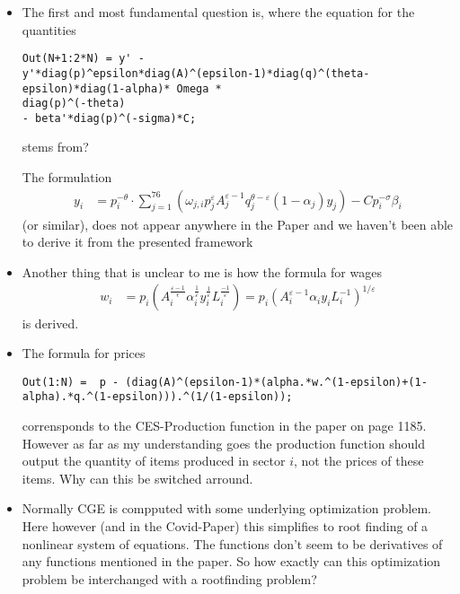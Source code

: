 \documentclass[a4paper,10pt]{article}
\title{}
\author{}
\begin{document}
\maketitle

\begin{itemize}
 \item The first and most fundamental question is, where the equation for the
quantities
 \begin{lstlisting}
Out(N+1:2*N) = y' -
y'*diag(p)^epsilon*diag(A)^(epsilon-1)*diag(q)^(theta-
epsilon)*diag(1-alpha)* Omega *
diag(p)^(-theta)
- beta'*diag(p)^(-sigma)*C;
    \end{lstlisting}
stems from?

The formulation  \begin{align}
                 y_i &= p_i^{-\theta} \cdot \sum_{j=1}^{76} (\omega_{j,i} p_j^\varepsilon A_j^{\varepsilon -1} q_j^{\theta - \varepsilon} (1 - \alpha_j) y_j) - C p_i^{-\sigma} \beta_i
                \end{align}
(or similar), does not appear anywhere in the Paper and we haven't been able to derive it from the presented framework
\item Another thing that is unclear to me is how the formula for wages
                \begin{align}
                                          w_i &= p_i (A_i ^ {\frac{\varepsilon -1}{\epsilon}} \alpha_i ^ {\frac 1 \varepsilon} y_i ^ {\frac 1 \varepsilon} L_i ^ {\frac {-1}{\varepsilon}}) = p_i (A_i^{\varepsilon-1}\alpha_i y_i L_i^{-1})^{1/\varepsilon}
                \end{align}
      is derived.
\item The formula for prices \begin{lstlisting}
Out(1:N) =  p - (diag(A)^(epsilon-1)*(alpha.*w.^(1-epsilon)+(1-alpha).*q.^(1-epsilon))).^(1/(1-epsilon));
                             \end{lstlisting}
corrensponds to the CES-Production function in the paper on page 1185. However as far as my understanding goes the production function should output the quantity of items produced in sector $i$, not the prices of these items. Why can this be switched arround.
\item Normally CGE is compputed with some underlying optimization problem. Here however (and in the Covid-Paper) this simplifies to root finding of a nonlinear system of equations. The functions don't seem to be derivatives of any functions mentioned in the paper. So how exactly can this optimization problem be interchanged with a rootfinding problem?

\end{itemize}
\end{document}

